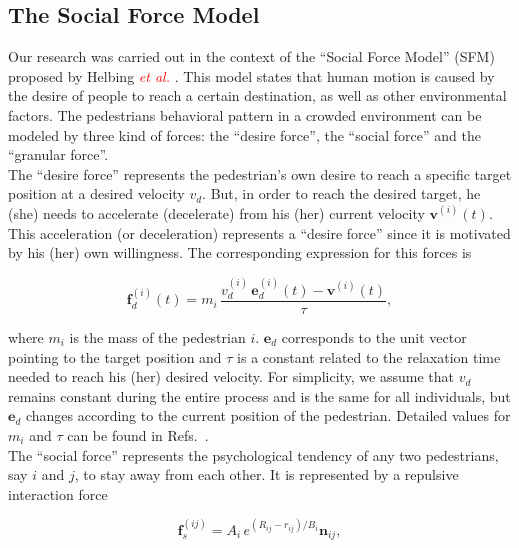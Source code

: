 \documentclass[preprint,12pt]{elsarticle}
\begin{document}
\subsection{\label{sfm}The Social Force Model}

Our research was carried out in the context of the ``Social Force Model'' (SFM) 
proposed by Helbing \textcolor{red} {\textit{et al.}} \cite{Helbing1}. This 
model states that human motion is caused by the desire of people to reach a 
certain destination, as well as other environmental factors. The pedestrians 
behavioral pattern in a crowded environment can be modeled by three kind of 
forces: the ``desire force'', the ``social force'' and the ``granular force''.\\

The ``desire force'' represents the pedestrian's own desire to reach a 
specific target position at a desired velocity $v_d$. But, in order to reach 
the desired target, he (she) needs to accelerate (decelerate) from his (her) 
current velocity $\mathbf{v}^{(i)}(t)$. This acceleration (or deceleration) 
represents a ``desire force'' since it is motivated by his (her) own 
willingness. The corresponding expression for this forces is 

\begin{equation}
        \mathbf{f}_d^ {(i)}(t) =  
m_i\,\displaystyle\frac{v_d^{(i)}\,\mathbf{e}_d^
{(i)}(t)-\mathbf{v}^{(i)}(t)}{\tau}, \label{desired}
\end{equation}

where $m_i$ is the mass of the pedestrian $i$. $\mathbf{e}_d$ 
corresponds to the unit vector pointing to the target position and $\tau$ is a 
constant related to the relaxation time needed to reach his (her) desired 
velocity. For simplicity, we assume that $v_d$ remains constant during the 
entire process and is the same for all individuals, but $\mathbf{e}_d$ changes 
according to the current position of the pedestrian. Detailed values for $m_i$ 
and $\tau$ can be found in Refs.~\cite{Helbing1,Dorso3}. \\

The ``social force'' represents the psychological tendency of any two pedestrians,  
say $i$ and $j$, to stay away from each other. It is represented by a repulsive interaction force 

\begin{equation}
        \mathbf{f}_s^{(ij)} = A_i\,e^{(R_{ij}-r_{ij})/B_i}\mathbf{n}_{ij}, 
        \label{social}
\end{equation}
\end{document}
